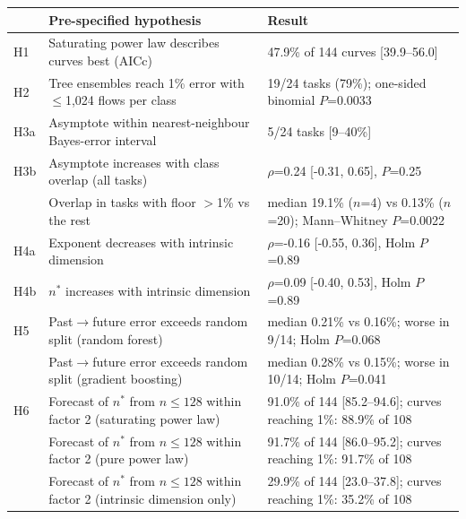 \begin{tabular}{llp{6.2cm}}
\toprule
& Pre-specified hypothesis & Result \\
\midrule
H1 & Saturating power law describes curves best (AICc) & 47.9\% of 144 curves [39.9--56.0] \\
H2 & Tree ensembles reach 1\% error with $\le$1,024 flows per class & 19/24 tasks (79\%); one-sided binomial $P$=0.0033 \\
H3a & Asymptote within nearest-neighbour Bayes-error interval & 5/24 tasks [9--40\%] \\
H3b & Asymptote increases with class overlap (all tasks) & $\rho$=0.24 [-0.31, 0.65], $P$=0.25 \\
 & Overlap in tasks with floor $>$1\% vs the rest & median 19.1\% ($n$=4) vs 0.13\% ($n$=20); Mann--Whitney $P$=0.0022 \\
H4a & Exponent decreases with intrinsic dimension & $\rho$=-0.16 [-0.55, 0.36], Holm $P$=0.89 \\
H4b & $n^*$ increases with intrinsic dimension & $\rho$=0.09 [-0.40, 0.53], Holm $P$=0.89 \\
H5 & Past$\to$future error exceeds random split (random forest) & median 0.21\% vs 0.16\%; worse in 9/14; Holm $P$=0.068 \\
 & Past$\to$future error exceeds random split (gradient boosting) & median 0.28\% vs 0.15\%; worse in 10/14; Holm $P$=0.041 \\
H6 & Forecast of $n^*$ from $n\le128$ within factor 2 (saturating power law) & 91.0\% of 144 [85.2--94.6]; curves reaching 1\%: 88.9\% of 108 \\
 & Forecast of $n^*$ from $n\le128$ within factor 2 (pure power law) & 91.7\% of 144 [86.0--95.2]; curves reaching 1\%: 91.7\% of 108 \\
 & Forecast of $n^*$ from $n\le128$ within factor 2 (intrinsic dimension only) & 29.9\% of 144 [23.0--37.8]; curves reaching 1\%: 35.2\% of 108 \\
\bottomrule
\end{tabular}
